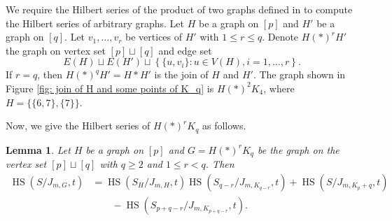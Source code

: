 \documentclass[12pt,reqno]{amsart}
\newcommand \hs{\operatorname{HS}}
\theoremstyle{plain}
\newtheorem{lemma}[theorem]{Lemma}
\theoremstyle{definition}
\begin{document}
We require the Hilbert series of the product of two graphs defined in \cite{HS-of-BEI-Arvind-Sarkar-2019} to compute the Hilbert series of arbitrary graphs. 
Let $H$ be a graph on $[p]$ and $H'$ be a graph on $[q]$. Let $v_1,\ldots,v_r$ be vertices of $H'$ with $1\leq r\leq q$. Denote $H(*)^rH'$ the graph on vertex set $[p]\sqcup[q]$ and edge set $$E(H)\sqcup E(H')\sqcup\left\{\{u,v_i\}:u\in V(H), i=1,\ldots,r\right\}.$$ If $r=q$, then $H(*)^qH'=H*H'$ is the join of $H$ and $H'$. The graph shown in Figure \ref{fig: join of H and some points of K_q} is $H(*)^2K_4$, where $H=\{\{6,7\},\{7\}\}$.
\vspace{2mm}
\begin{figure}[h]
    \centering
    \caption{}\label{fig: join of H and some points of K_q}
    \label{fig:placeholder}
\end{figure}
\newline
Now, we give the Hilbert series of $H(*)^rK_q$ as follows.
\begin{lemma}\label{lemma: hs of join of a graph and some points of a complete graph}
    Let $H$ be a graph on $[p]$ and $G=H(*)^rK_q$ be the graph on the vertex set $[p]\sqcup[q]$ with $q\geq2$ and $1\leq r<q$. Then \begin{align*}
    \hs(S/J_{m,G},t)&=\hs(S_H/J_{m,H},t)\hs(S_{{q-r}}/J_{m,K_{q-r}},t)+\hs(S/{J_{m,K_p+q}},t)\\
    &\quad\quad-\hs(S_{{p+q-r}}/J_{m,K_{p+q-r}},t).
    \end{align*}
\end{lemma}
\end{document}
